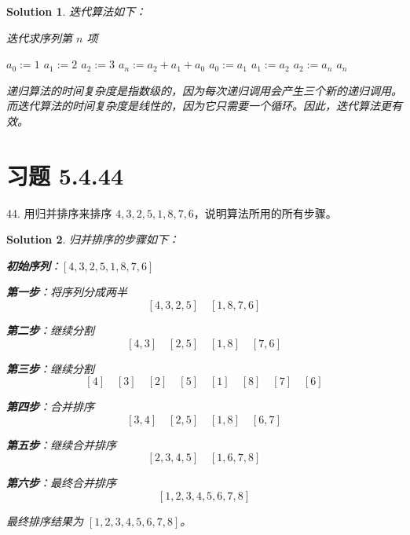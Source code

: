 \documentclass[UTF8]{report}
\newtheorem{solution}{Solution}
\theoremstyle{MyLineTheoremStyle} %
\theoremstyle{MyBlockTheoremStyle} %
\theoremstyle{MySubsubsectionStyle} %
\begin{document}
\begin{solution}
    迭代算法如下：
    \begin{algorithm}
        \caption{迭代求序列第 $n$ 项}
        \begin{algorithmic}[1]
                    \State {}
                    \State {}
                    \State {}
                \Else
                    \State $a_0 := 1$
                    \State $a_1 := 2$
                    \State $a_2 := 3$
                        \State $a_n := a_2 + a_1 + a_0$
                        \State $a_0 := a_1$
                        \State $a_1 := a_2$
                        \State $a_2 := a_n$
                    \EndFor
                    \State \Return $a_n$
                \EndIf
            \EndFunction
        \end{algorithmic}
    \end{algorithm}

    递归算法的时间复杂度是指数级的，因为每次递归调用会产生三个新的递归调用。而迭代算法的时间复杂度是线性的，因为它只需要一个循环。因此，迭代算法更有效。
\end{solution}

\section{习题 5.4.44}
44. 用归并排序来排序 $4, 3, 2, 5, 1, 8, 7, 6$，说明算法所用的所有步骤。

\begin{solution}
    归并排序的步骤如下：

    \textbf{初始序列}：$[4, 3, 2, 5, 1, 8, 7, 6]$

    \textbf{第一步}：将序列分成两半
    \[
    [4, 3, 2, 5] \quad [1, 8, 7, 6]
    \]

    \textbf{第二步}：继续分割
    \[
    [4, 3] \quad [2, 5] \quad [1, 8] \quad [7, 6]
    \]

    \textbf{第三步}：继续分割
    \[
    [4] \quad [3] \quad [2] \quad [5] \quad [1] \quad [8] \quad [7] \quad [6]
    \]

    \textbf{第四步}：合并排序
    \[
    [3, 4] \quad [2, 5] \quad [1, 8] \quad [6, 7]
    \]

    \textbf{第五步}：继续合并排序
    \[
    [2, 3, 4, 5] \quad [1, 6, 7, 8]
    \]

    \textbf{第六步}：最终合并排序
    \[
    [1, 2, 3, 4, 5, 6, 7, 8]
    \]

    最终排序结果为 $[1, 2, 3, 4, 5, 6, 7, 8]$。
\end{solution}
\end{document}
